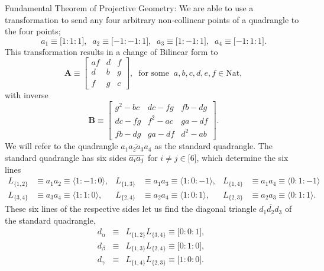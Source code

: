\documentclass{unswthesis}
\begin{document}
Fundamental Theorem of Projective Geometry:\newline
We are able to use a transformation to send any four arbitrary non-collinear
points of a quadrangle to the four points; 
\begin{equation*}
a_{1}\equiv \lbrack 1:1:1],\;\;a_{2}\equiv \lbrack -1:-1:1],\;\;a_{3}\equiv
\lbrack 1:-1:1],\;\;a_{4}\equiv \lbrack -1:1:1]. 
\end{equation*}%
This transformation results in a change of Bilinear form to 
\begin{equation*}
\mathbf{A}\equiv 
\begin{bmatrix}
af & d & f \\ 
d & b & g \\ 
f & g & c%
\end{bmatrix}%
,\;\;\text{for some}\;\;a,b,c,d,e,f\in \text{Nat}, 
\end{equation*}%
with inverse 
\begin{equation*}
\mathbf{B}\equiv 
\begin{bmatrix}
g^{2}-bc & dc-fg & fb-dg \\ 
dc-fg & f^{2}-ac & ga-df \\ 
fb-dg & ga-df & d^{2}-ab%
\end{bmatrix}%
. 
\end{equation*}%
We will refer to the quadrangle $\overline{a_{1}a_{2}a_{3}a_{4}}$ as the
standard quadrangle. The standard quadrangle has six sides $\overline{%
a_{i}a_{j}}$ for $i\neq j\in \lbrack 6]$, which determine the six lines 
\begin{align*}
L_{\{1,2\}}& \equiv a_{1}a_{2}\equiv \langle 1:-1:0\rangle , & L_{\{1,3\}}&
\equiv a_{1}a_{3}\equiv \langle 1:0:-1\rangle , & L_{\{1,4\}}& \equiv
a_{1}a_{4}\equiv \langle 0:1:-1\rangle \\
L_{\{3,4\}}& \equiv a_{3}a_{4}\equiv \langle 1:1:0\rangle , & L_{\{2,4\}}&
\equiv a_{2}a_{4}\equiv \langle 1:0:1\rangle , & L_{\{2,3\}}& \equiv
a_{2}a_{3}\equiv \langle 0:1:1\rangle .
\end{align*}%
These six lines of the respective sides let us find the diagonal triangle $%
\overline{d_{1}d_{2}d_{3}}$ of the standard quadrangle, 
\begin{eqnarray*}
d_{\alpha } &\equiv &L_{\{1,2\}}L_{\{3,4\}}\equiv \lbrack 0:0:1],\;\; \\
d_{\beta } &\equiv &L_{\{1,3\}}L_{\{2,4\}}\equiv \lbrack 0:1:0],\;\; \\
d_{\gamma } &\equiv &L_{\{1,4\}}L_{\{2,3\}}\equiv \lbrack 1:0:0].
\end{eqnarray*}%
\end{document}
